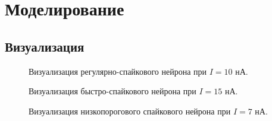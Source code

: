 \chapter{Моделирование}
\label{ch:chap3}


\section{Визуализация}

\begin{figure}[h]
\caption{Визуализация регулярно-спайкового нейрона при $I=10$ нА.}
\label{1_rs}
\end{figure}

\begin{figure}[h]
	\caption{Визуализация быстро-спайкового нейрона при $I=15$ нА.}
	\label{1_fs}
\end{figure}

\begin{figure}[h]
	\caption{Визуализация низкопорогового спайкового нейрона при $I=7$ нА.}
	\label{1_lts}
\end{figure}

